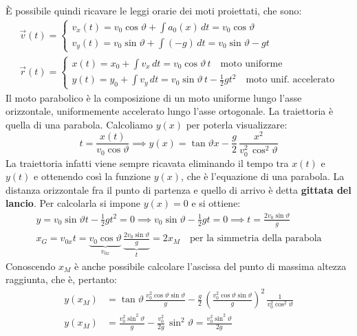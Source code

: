 \documentclass[10pt,a4paper]{book}
\begin{document}
È possibile quindi ricavare le leggi orarie dei moti proiettati, che sono:
\begin{gather*}
	\vec{v}(t) =
		\begin{cases}
			v_x(t)=v_0\cos\vartheta+\int a_0(x)\,dt=v_0\cos\vartheta \\
			v_y(t)=v_0\sin\vartheta+\int (-g)\,dt=v_0\sin\vartheta-gt
		\end{cases} \\
	\vec{r}(t) =
		\begin{cases}
			x(t)=x_0+\int v_x\,dt=v_0\cos\vartheta\,t \quad \text{moto uniforme} \\
			y(t)=y_0+\int v_y\,dt=v_0\sin\vartheta\,t-\frac{1}{2}gt^2 \quad \text{moto unif. accelerato}
		\end{cases}
\end{gather*}
Il moto parabolico è la composizione di un moto uniforme lungo l'asse orizzontale, uniformemente accelerato lungo l'asse ortogonale. La traiettoria è quella di una parabola. Calcoliamo $y(x)$ per poterla visualizzare:
\[
	t=\frac{x(t)}{v_0\cos\vartheta} \implies y(x)=\tan\vartheta x-\frac{g}{2} \,\frac{x^2}{v_0^2\,\cos^2\vartheta}
\]
La traiettoria infatti viene sempre ricavata eliminando il tempo tra $x(t)$ e $y(t)$ e ottenendo così la funzione $y(x)$, che è l'equazione di una parabola. La distanza orizzontale fra il punto di partenza e quello di arrivo è detta \textbf{gittata del lancio}. Per calcolarla si impone $y(x)=0$ e si ottiene:
\begin{gather*}
	y=v_0\sin\vartheta t-\frac{1}{2}gt^2=0 \implies v_0\sin\vartheta-\frac{1}{2}gt=0 \implies t=\frac{2v_0\sin\vartheta}{g} \\
	x_G=v_{0x}t=\underbrace{v_0\cos\vartheta}_{v_{0x}}\,\underbrace{\frac{2v_0\sin\vartheta}{g}}_{t}=2x_M \quad \text{per la simmetria della parabola}
\end{gather*}
Conoscendo $x_M$ è anche possibile calcolare l'ascissa del punto di massima altezza raggiunta, che è, pertanto:
\begin{align*}
	y(x_M)&=\tan\vartheta\,\frac{v_0^2\cos\vartheta \sin\vartheta}{g}-\frac{g}{2}\,\left(\frac{v_0^2\cos\vartheta \sin\vartheta}{g}\right)^2\,\frac{1}{v_0^2\cos^2\vartheta} \\
	y(x_M)&=\frac{v_0^2 \sin^2\vartheta}{g}-\frac{v_0^2}{2g}\,\sin^2\vartheta=\frac{v_0^2\sin^2\vartheta}{2g}
\end{align*}
\end{document}

